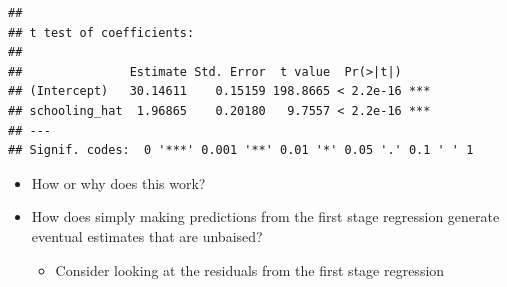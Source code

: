 \documentclass[
]{article}
\providecommand{\tightlist}{%
  \setlength{\itemsep}{0pt}\setlength{\parskip}{0pt}}
\begin{document}
\begin{verbatim}
## 
## t test of coefficients:
## 
##               Estimate Std. Error  t value  Pr(>|t|)    
## (Intercept)   30.14611    0.15159 198.8665 < 2.2e-16 ***
## schooling_hat  1.96865    0.20180   9.7557 < 2.2e-16 ***
## ---
## Signif. codes:  0 '***' 0.001 '**' 0.01 '*' 0.05 '.' 0.1 ' ' 1
\end{verbatim}

\begin{itemize}
\item
  How or why does this work?
\item
  How does simply making predictions from the first stage regression generate eventual estimates that are unbaised?

  \begin{itemize}
  \tightlist
  \item
    Consider looking at the residuals from the first stage regression
  \end{itemize}
\end{itemize}
\end{document}
